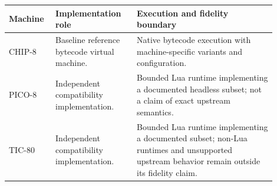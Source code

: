\begin{tabular}{p{0.14\linewidth} p{0.28\linewidth} p{0.48\linewidth}}
\toprule
\textbf{Machine} & \textbf{Implementation role} & \textbf{Execution and fidelity boundary} \\
\midrule
CHIP-8 & Baseline reference bytecode virtual machine. & Native bytecode execution with machine-specific variants and configuration. \\
PICO-8 & Independent compatibility implementation. & Bounded Lua runtime implementing a documented headless subset; not a claim of exact upstream semantics. \\
TIC-80 & Independent compatibility implementation. & Bounded Lua runtime implementing a documented subset; non-Lua runtimes and unsupported upstream behavior remain outside its fidelity claim. \\
\bottomrule
\end{tabular}
